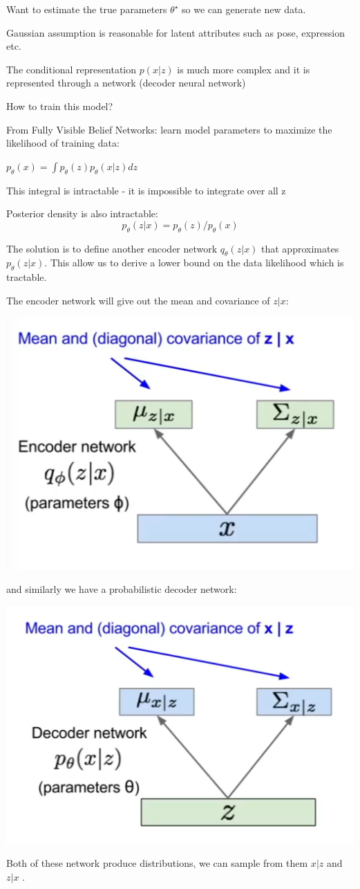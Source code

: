 Want to estimate the true parameters $\theta^\star$ so we can generate new data.

Gaussian assumption is reasonable for latent attributes such as pose, expression etc.

The conditional representation $p(x|z)$ is much more complex and it is represented through a network (decoder neural network)

How to train this model?

From Fully Visible Belief Networks: learn  model parameters to maximize the likelihood of training data:

$p_\theta(x) = \int p_\theta 	(z) p_\theta(x|z)dz$ 

This integral is intractable - it is impossible to integrate over all z

Posterior density is also intractable: $$p_\theta(z|x)=p_\theta(z)/p_\theta(x) $$

The solution is to define another encoder network $q_\theta(z|x)$ that approximates $p_\theta(z|x)$. This allow us to derive a lower bound on the data likelihood which is tractable. 

The encoder network will give out the mean and covariance of $z|x$:

\includegraphics[width=0.5\columnwidth]{fei_fei_li/lecture_13/encoder_theta.png}

and similarly we have a probabilistic decoder network:

\includegraphics[width=0.5\columnwidth]{fei_fei_li/lecture_13/prob_decoder.png}

Both of these network produce distributions, we can sample from them $x|z$ and $z|x$ .

